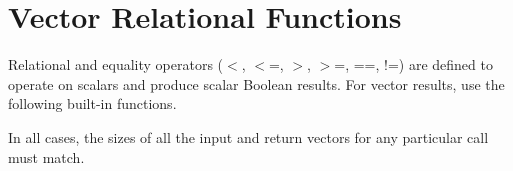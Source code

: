 \hypertarget{group__core__func__vector__relational}{\section{\-Vector \-Relational \-Functions}
\label{group__core__func__vector__relational}
}
\-Relational and equality operators ($<$, $<$=, $>$, $>$=, ==, !=) are defined to operate on scalars and produce scalar \-Boolean results. \-For vector results, use the following built-\/in functions.

\-In all cases, the sizes of all the input and return vectors for any particular call must match. 